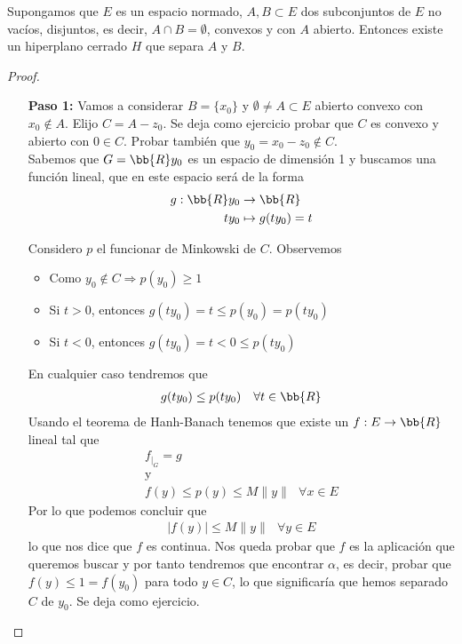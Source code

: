 \begin{teo}
    Supongamos que $E$ es un espacio normado, $A,B\subset E$ dos subconjuntos de $E$ no vacíos, disjuntos, es decir, $A\cap B = \emptyset$, convexos y con $A$ abierto. Entonces existe un hiperplano cerrado $H$ que separa $A$ y $B$.
    \begin{proof}\
        \begin{itemize}
            \item[\textbf{Paso 1:}] Vamos a considerar $B=\{x_0\}$ y $\emptyset \neq A \subset E$ abierto convexo con $x_0\notin A$. Elijo $C = A -z_0$. Se deja como ejercicio probar que $C$ es convexo y abierto con $0\in C$. Probar también que $y_0 = x_0-z_0\notin C$.\\
            
            Sabemos que $G=\bb{R}y_0$ es un espacio de dimensión 1 y buscamos 
            una función lineal, que en este espacio será de la forma
            \begin{align*}
                g:\bb{R}y_0 &\to \bb{R}\\
                t{y_0} & \mapsto g(t{y_0}) = t
            \end{align*}

            Considero $p$ el funcionar de Minkowski de $C$. Observemos 

            \begin{itemize}
                \item Como $y_0\notin C \Rightarrow p(y_0) \geq 1$
                \item Si $t>0$, entonces $g(ty_0)=t \leq p(y_0) = p(ty_0)$
                \item Si $t<0$, entonces $g(ty_0) = t < 0 \leq p(ty_0)$
            \end{itemize}
            En cualquier caso tendremos que 
            \begin{gather*}
                g(ty_0)\leq p(ty_0)\ \ \ \forall t \in \bb{R}
            \end{gather*}
            Usando el teorema de Hanh-Banach tenemos que existe un  $f:E\to \bb{R}$ lineal tal que 
            \begin{gather*}
                f_{|_G} = g\\
                \text{y}\\
                f(y) \leq p(y) \leq M \|y\|\ \ \ \forall x \in E
            \end{gather*}
            Por lo que podemos concluir que 
            \begin{gather*}
                |f(y)| \leq M\|y\| \ \ \ \forall y \in E
            \end{gather*}
            lo que nos dice que $f$ es continua. Nos queda probar que $f$ es la aplicación que queremos buscar y por tanto tendremos que encontrar $\alpha$, es decir, probar que $f(y)\leq 1 = f(y_0)$ para todo $y\in C$, lo que significaría que hemos separado $C$ de $y_0$. Se deja como ejercicio.


\end{itemize}
\end{proof}
\end{teo}
